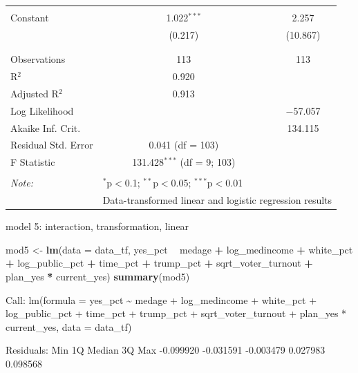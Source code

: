 \documentclass[
]{article}
\newenvironment{Shaded}{\begin{snugshade}}{\end{snugshade}}
\newcommand{\DataTypeTok}[1]{\textcolor[rgb]{0.13,0.29,0.53}{#1}}
\newcommand{\KeywordTok}[1]{\textcolor[rgb]{0.13,0.29,0.53}{\textbf{#1}}}
\newcommand{\NormalTok}[1]{#1}
\newcommand{\OperatorTok}[1]{\textcolor[rgb]{0.81,0.36,0.00}{\textbf{#1}}}
\newcommand{\StringTok}[1]{\textcolor[rgb]{0.31,0.60,0.02}{#1}}
\begin{document}
\begin{table}[!htbp]
\begin{tabular}{@{\extracolsep{5pt}}lcc}
  & & \\ 
 Constant & 1.022$^{***}$ & 2.257 \\ 
  & (0.217) & (10.867) \\ 
  & & \\ 
\hline \\[-1.8ex] 
Observations & 113 & 113 \\ 
R$^{2}$ & 0.920 &  \\ 
Adjusted R$^{2}$ & 0.913 &  \\ 
Log Likelihood &  & $-$57.057 \\ 
Akaike Inf. Crit. &  & 134.115 \\ 
Residual Std. Error & 0.041 (df = 103) &  \\ 
F Statistic & 131.428$^{***}$ (df = 9; 103) &  \\ 
\hline 
\hline \\[-1.8ex] 
\textit{Note:}  & \multicolumn{2}{l}{$^{*}$p$<$0.1; $^{**}$p$<$0.05; $^{***}$p$<$0.01} \\ 
 & \multicolumn{2}{l}{Data-transformed linear and logistic regression results} \\ 
\end{tabular} 
\end{table}

model 5: interaction, transformation, linear

\begin{Shaded}
\begin{Highlighting}[]
\NormalTok{mod5 <-}\StringTok{ }\KeywordTok{lm}\NormalTok{(}\DataTypeTok{data =}\NormalTok{ data_tf, yes_pct }\OperatorTok{~}\StringTok{ }\NormalTok{medage }\OperatorTok{+}\StringTok{ }\NormalTok{log_medincome }\OperatorTok{+}\StringTok{ }\NormalTok{white_pct }\OperatorTok{+}\StringTok{ }\NormalTok{log_public_pct }\OperatorTok{+}\StringTok{ }\NormalTok{time_pct }\OperatorTok{+}\StringTok{ }\NormalTok{trump_pct }\OperatorTok{+}\StringTok{ }\NormalTok{sqrt_voter_turnout }\OperatorTok{+}\StringTok{ }\NormalTok{plan_yes }\OperatorTok{*}\StringTok{ }\NormalTok{current_yes)}
\KeywordTok{summary}\NormalTok{(mod5)}
\end{Highlighting}
\end{Shaded}

Call: lm(formula = yes\_pct \textasciitilde{} medage + log\_medincome +
white\_pct + log\_public\_pct + time\_pct + trump\_pct +
sqrt\_voter\_turnout + plan\_yes * current\_yes, data = data\_tf)

Residuals: Min 1Q Median 3Q Max -0.099920 -0.031591 -0.003479 0.027983
0.098568
\end{document}
